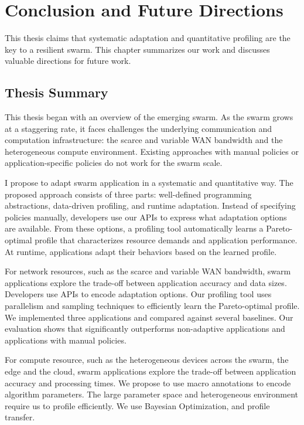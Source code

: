 \documentclass[thesis.tex]{subfiles}
\begin{document}
\chapter{Conclusion and Future Directions}
\label{cha:concl-future-work}

This thesis claims that systematic adaptation and quantitative profiling are the
key to a resilient swarm. This chapter summarizes our work and discusses
valuable directions for future work.

\section{Thesis Summary}
\label{sec:thesis-summary}

This thesis began with an overview of the emerging swarm. As the swarm grows at
a staggering rate, it faces challenges the underlying communication and
computation infrastructure: the scarce and variable WAN bandwidth and the
heterogeneous compute environment. Existing approaches with manual policies or
application-specific policies do not work for the swarm scale.

I propose to adapt swarm application in a systematic and quantitative way.  The
proposed approach consists of three parts: well-defined programming
abstractions, data-driven profiling, and runtime adaptation. Instead of
specifying policies manually, developers use our APIs to express what adaptation
options are available. From these options, a profiling tool automatically learns
a Pareto-optimal profile that characterizes resource demands and application
performance. At runtime, applications adapt their behaviors based on the learned
profile.

For network resources, such as the scarce and variable WAN bandwidth, swarm
applications explore the trade-off between application accuracy and data
sizes. Developers use \maybe{} APIs to encode adaptation options. Our profiling
tool uses parallelism and sampling techniques to efficiently learn the
Pareto-optimal profile. We implemented three applications and compared against
several baselines. Our evaluation shows that \awstream{} significantly
outperforms non-adaptive applications and applications with manual policies.

For compute resource, such as the heterogeneous devices across the swarm, the
edge and the cloud, swarm applications explore the trade-off between application
accuracy and processing times. We propose to use macro annotations to encode
algorithm parameters. The large parameter space and heterogeneous environment
require us to profile efficiently. We use Bayesian Optimization, and profile
transfer.
\end{document}
